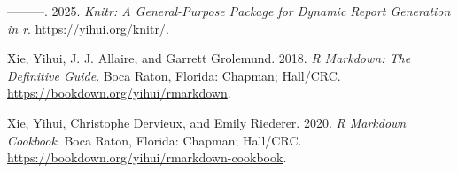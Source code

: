 \documentclass[
  11pt,
]{article}
\newlength{\cslhangindent}
\newenvironment{CSLReferences}[2] %
 {\begin{list}{}{%
  \setlength{\itemindent}{0pt}
  \setlength{\leftmargin}{0pt}
  \setlength{\parsep}{0pt}
  \ifodd #1
   \setlength{\leftmargin}{\cslhangindent}
   \setlength{\itemindent}{-1\cslhangindent}
  \fi
  \setlength{\itemsep}{#2\baselineskip}}}
 {\end{list}}
\begin{document}
\begin{CSLReferences}{1}{0}
---------. 2025. \emph{Knitr: A General-Purpose Package for Dynamic
Report Generation in r}. \url{https://yihui.org/knitr/}.

Xie, Yihui, J. J. Allaire, and Garrett Grolemund. 2018. \emph{R
Markdown: The Definitive Guide}. Boca Raton, Florida: Chapman; Hall/CRC.
\url{https://bookdown.org/yihui/rmarkdown}.

Xie, Yihui, Christophe Dervieux, and Emily Riederer. 2020. \emph{R
Markdown Cookbook}. Boca Raton, Florida: Chapman; Hall/CRC.
\url{https://bookdown.org/yihui/rmarkdown-cookbook}.

\end{CSLReferences}
\end{document}
